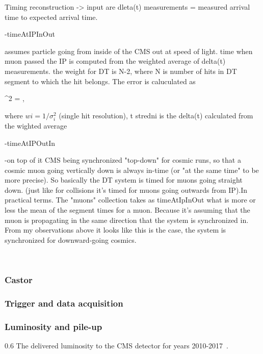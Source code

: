 Timing reconstruction -> input are dleta(t) measurements = measured arrival time to expected arrival time. 

-timeAtIPInOut

assumes particle going from inside of the CMS out at speed of light. time when muon passed the IP is computed from the weighted average of delta(t) measurements. the weight for DT is N-2, where N is number of hits in DT segment to which the hit belongs.  The error is caluculated as

{
 \sigma^{2} =  \times {} \times {},
 
}

where $wi = 1/\sigma_{i}^2$ (single hit resolution), t stredni is the delta(t) calculated from the  wighted average

-timeAtIPOutIn 


-on top of it
 CMS being synchronized "top-down" for cosmic runs, so that a cosmic muon going vertically down is always in-time (or "at the same time" to be more precise). So basically the DT system is timed for muons going straight down. (just like for collisions it's timed for muons going outwards from IP).In practical terms. The "muons" collection takes as timeAtIpInOut what is more or less the mean of the segment times for a muon. Because it's assuming that the muon is propagating in the same direction that the system is synchronized in. From my observations above it looks like this is the case, the system is synchronized for downward-going cosmics.



~\cite{Traczyk:1365029}



\subsubsection{Castor}
\subsubsection{Trigger and data acquisition}
\subsubsection{Luminosity and pile-up}


                 {0.6}       %
                 { The delivered luminosity to the CMS detector for years 2010-2017~\cite{website:CMSlumi}. }

